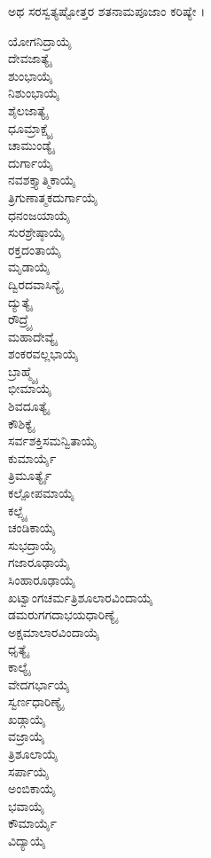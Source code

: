 ಅಥ ಸರಸ್ವತ್ಯಷ್ಟೋತ್ತರ ಶತನಾಮಪೂಜಾಂ ಕರಿಷ್ಯೇ ।
\begin{multicols}{2} ಯೋಗನಿದ್ರಾಯೈ\\
ದೇವಜಾತ್ಯೈ\\
ಶುಂಭಾಯೈ\\
ನಿಶುಂಭಾಯೈ\\
ಶೈಲಜಾತ್ಯೈ\\
ಧೂಮ್ರಾಕ್ಷ್ಯೈ\\
ಚಾಮುಂಡ್ಯೈ\\
ದುರ್ಗಾಯೈ\\
ನವಶಕ್ತ್ಯಾತ್ಮಿಕಾಯೈ\\
ತ್ರಿಗುಣಾತ್ಮಕದುರ್ಗಾಯೈ\\
ಧನಂಜಯಾಯೈ\\
ಸುರಶ್ರೇಷ್ಠಾಯೈ\\
ರಕ್ತದಂತಾಯೈ\\
ಮೃಡಾಯೈ\\
ದ್ವಿರದವಾಸಿನ್ಯೈ\\
ದ್ಯುತ್ಯೈ\\
ರೌದ್ರ್ಯೈ\\
ಮಹಾದೇವ್ಯೈ\\
ಶಂಕರವಲ್ಲಭಾಯೈ\\
ಬ್ರಾಹ್ಮ್ಯೈ\\
ಭೀಮಾಯೈ\\
ಶಿವದೂತ್ಯೈ\\
ಕೌಶಿಕ್ಯೈ\\
ಸರ್ವಶಕ್ತಿಸಮನ್ವಿತಾಯೈ\\
ಕುಮಾರ್ಯೈ\\
ತ್ರಿಮೂರ್ತ್ಯೈ\\
ಕಲ್ಪೋಪಮಾಯೈ\\
ಕಲ್ಪ್ಯೈ\\
ಚಂಡಿಕಾಯೈ\\
ಸುಭದ್ರಾಯೈ\\
ಗಜಾರೂಢಾಯೈ\\
ಸಿಂಹಾರೂಢಾಯೈ\\
ಖಟ್ವಾಂಗಚರ್ಮತ್ರಿಶೂಲಾರವಿಂದಾಯೈ\\
ಡಮರುಗಗದಾಭಯಧಾರಿಣ್ಯೈ\\
ಅಕ್ಷಮಾಲಾರವಿಂದಾಯೈ\\
ಧೃತ್ಯೈ\\
ಕಾಲ್ಯೈ\\
ವೇದಗರ್ಭಾಯೈ\\
ಸ್ವರ್ಣಧಾರಿಣ್ಯೈ\\
ಖಡ್ಗಾಯೈ\\
ವಜ್ರಾಯೈ\\
ತ್ರಿಶೂಲಾಯೈ\\
ಸರ್ಪಾಯೈ\\
ಅಂಬಿಕಾಯೈ\\
ಭವಾಯೈ\\
ಕೌಮಾರ್ಯೈ\\
ವಿದ್ಯಾಯೈ\\

\end{multicols}
